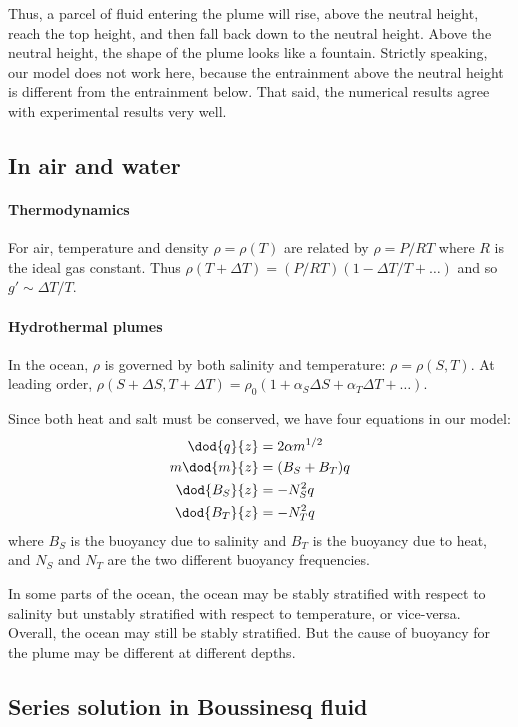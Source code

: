 Thus, a parcel of fluid entering the plume will rise, above the neutral height,
reach the top height, and then fall back down to the neutral height. Above the
neutral height, the shape of the plume looks like a fountain. Strictly speaking,
our model does not work here, because the entrainment above the neutral height
is different from the entrainment below. That said, the numerical results agree
with experimental results very well.

\subsection{In air and water}

\paragraph{Thermodynamics} For air, temperature and density $\rho = \rho(T)$ are
related by $\rho = P/RT$ where $R$ is the ideal gas constant. Thus
$\rho(T+\Delta T) = (P/RT) (1-\Delta T/T+\dots)$ and so $g' \sim \Delta T/T$. 

\paragraph{Hydrothermal plumes} In the ocean, $\rho$ is governed by both
salinity and temperature: $\rho = \rho(S,T)$. At leading order, $\rho(S+\Delta
S, T+\Delta T) = \rho_0 (1+\alpha_S \Delta S + \alpha_T \Delta T + \dots)$.

Since both heat and salt must be conserved, we have four equations in our model:
\begin{align}
    \dod{q}{z} &= 2\alpha m^{1/2} \\
    m\dod{m}{z} &= (B_S + B_T) q \\
    \dod{B_S}{z} &= -N_S^2 q \\
    \dod{B_T}{z} &= -N_T^2 q
\end{align}
where $B_S$ is the buoyancy due to salinity and $B_T$ is the buoyancy due to
heat, and $N_S$ and $N_T$ are the two different buoyancy frequencies.

In some parts of the ocean, the ocean may be stably stratified with respect to
salinity but unstably stratified with respect to temperature, or vice-versa.
Overall, the ocean may still be stably stratified. But the cause of buoyancy for
the plume may be different at different depths.

\subsection{Series solution in Boussinesq fluid}

